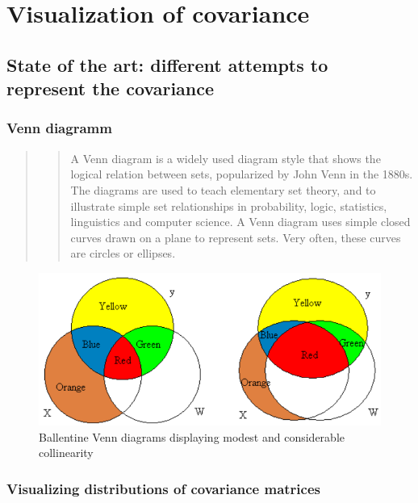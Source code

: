 \documentclass[
]{report}
\begin{document}
\hypertarget{visualization-of-covariance}{%
\chapter{Visualization of covariance}\label{visualization-of-covariance}}

\hypertarget{state-of-the-art-different-attempts-to-represent-the-covariance}{%
\section{State of the art: different attempts to represent the covariance}\label{state-of-the-art-different-attempts-to-represent-the-covariance}}

\hypertarget{venn-diagramm}{%
\subsection{Venn diagramm}\label{venn-diagramm}}

\begin{quote}
\begin{quote}
A Venn diagram is a widely used diagram style that shows the logical relation between sets, popularized by John Venn in the 1880s. The diagrams are used to teach elementary set theory, and to illustrate simple set relationships in probability, logic, statistics, linguistics and computer science. A Venn diagram uses simple closed curves drawn on a plane to represent sets. Very often, these curves are circles or ellipses.
\end{quote}
\end{quote}

\begin{figure}
    \centering
    \includegraphics[width= 250 pt]{venn_colinearity.PNG}
    \caption{Ballentine Venn diagrams displaying modest and considerable collinearity}
    \label{fig:my_label}
\end{figure}

\hypertarget{visualizing-distributions-of-covariance-matrices}{%
\subsection{Visualizing distributions of covariance matrices}\label{visualizing-distributions-of-covariance-matrices}}
\end{document}
